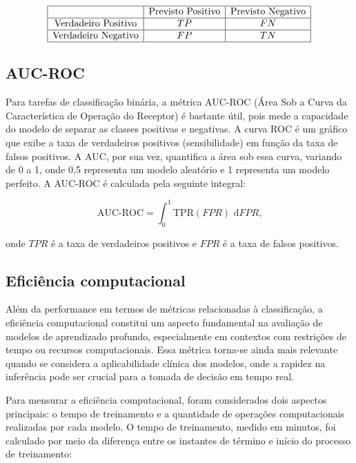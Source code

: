 \[
\begin{array}{|c|c|c|}
\hline
 & \text{Previsto Positivo} & \text{Previsto Negativo} \\
\hline
\text{Verdadeiro Positivo} & TP & FN \\
\hline
\text{Verdadeiro Negativo} & FP & TN \\
\hline
\end{array}
\]

\subsection{AUC-ROC}
Para tarefas de classificação binária, a métrica AUC-ROC (Área Sob a Curva da Característica de Operação do Receptor) é bastante útil, pois mede a capacidade do modelo de separar as classes positivas e negativas. A curva ROC é um gráfico que exibe a taxa de verdadeiros positivos (sensibilidade) em função da taxa de falsos positivos. A AUC, por sua vez, quantifica a área sob essa curva, variando de 0 a 1, onde 0,5 representa um modelo aleatório e 1 representa um modelo perfeito. A AUC-ROC é calculada pela seguinte integral:

\begin{equation}
    \text{AUC-ROC} = \int_{0}^{1} \text{TPR}(FPR) \text{ d}FPR \text{,}
\end{equation}

onde $TPR$ é a taxa de verdadeiros positivos e $FPR$ é a taxa de falsos positivos.

\subsection{Eficiência computacional}

Além da performance em termos de métricas relacionadas à classificação, a eficiência computacional constitui um aspecto fundamental na avaliação de modelos de aprendizado profundo, especialmente em contextos com restrições de tempo ou recursos computacionais. Essa métrica torna-se ainda mais relevante quando se considera a aplicabilidade clínica dos modelos, onde a rapidez na inferência pode ser crucial para a tomada de decisão em tempo real.

Para mensurar a eficiência computacional, foram considerados dois aspectos principais: o tempo de treinamento e a quantidade de operações computacionais realizadas por cada modelo. O tempo de treinamento, medido em minutos, foi calculado por meio da diferença entre os instantes de término e início do processo de treinamento:


